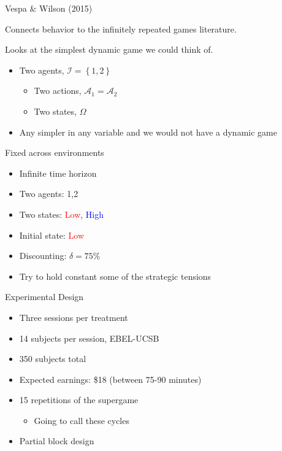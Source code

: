 \documentclass{beamer}
\begin{document}
\begin{frame}{Vespa \& Wilson (2015) }

Connects behavior to the infinitely repeated
games literature.

Looks at the simplest dynamic game we could think of.

\begin{itemize}
\item Two agents, $\mathcal{I}=\left\{ 1,2\right\} $

\begin{itemize}
\item Two actions, $\mathcal{A}_{1}=\mathcal{A}_{2}$
\item Two states, $\Omega$ \pause
\end{itemize}
\item Any simpler in any variable and we would not have a dynamic game
\end{itemize}
\end{frame}


\begin{frame}{Fixed across environments}

\begin{itemize}
\item Infinite time horizon
\item Two agents: 1,2
\item Two states: \textcolor{red}{Low}, \textcolor{blue}{High}
\item Initial state: \textcolor{red}{Low}
\item Discounting: $\delta=75\%$\pause
\item Try to hold constant some of the strategic tensions
\end{itemize}
\end{frame}

\begin{frame}{Experimental Design}

\begin{itemize}
\item Three sessions per treatment
\item 14 subjects per session, EBEL-UCSB
\item 350 subjects total
\item Expected earnings: \$18 (between 75-90 minutes)
\item 15 repetitions of the supergame

\begin{itemize}
\item Going to call these cycles
\end{itemize}
\item Partial block design
\end{itemize}
\end{frame}
\end{document}
